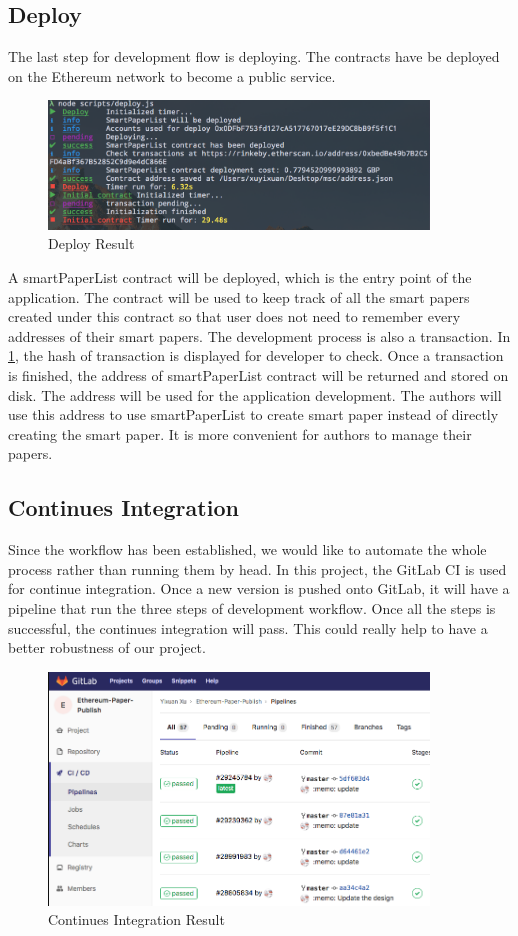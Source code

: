\documentclass[openany,12pt]{ecsthesis}      %
\begin{document}
\subsection{Deploy}
The last step for development flow is deploying. 
The contracts have be deployed on the Ethereum network to become a public service.
\begin{figure}[H]
  \centering
  \includegraphics[width=0.9\textwidth]{deploy.png}
  \caption{Deploy Result}
  \label{deploy} 
\end{figure}
A smartPaperList contract will be deployed, which is the entry point of the application.
The contract will be used to keep track of 
all the smart papers created under this contract 
so that user does not need to remember every addresses of their smart papers. 
The development process is also a transaction. 
In \ref{deploy}, the hash of transaction is displayed for developer to check. 
Once a transaction is finished, 
the address of smartPaperList contract will be returned and stored on disk. 
The address will be used for the application development. 
The authors will use this address to use smartPaperList to create smart paper instead of directly creating the smart paper.
It is more convenient for authors to manage their papers.
\subsection{Continues Integration}
Since the workflow has been established, we would like to automate the whole process rather than running them by head.
In this project, the GitLab CI is used for continue integration. 
Once a new version is pushed onto GitLab, 
it will have a pipeline that run the three steps of development workflow.
Once all the steps is successful, the continues integration will pass. 
This could really help to have a better robustness of our project.
\begin{figure}[H]
  \centering
  \includegraphics[width=0.9\textwidth]{ci.png}
  \caption{Continues Integration Result}
  \label{ci} 
\end{figure}
\end{document}
